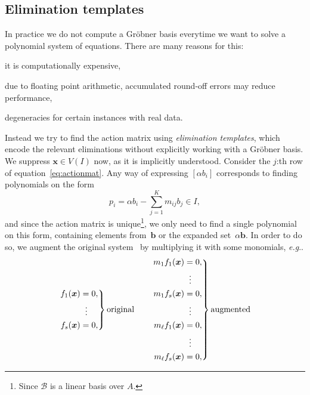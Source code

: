 \documentclass[11pt,a4paper]{article}
\makeatletter
\theoremstyle{definition}
\newcommand{\mat}[1]{\bm{#1}}
\DeclareRobustCommand\eg{\emph{e.g}\@ifnextchar.{}{.\@}}
\makeatother
\begin{document}
\subsection{Elimination templates}
In practice we do not compute a Gröbner basis everytime we want to solve a polynomial system
of equations. There are many reasons for this:
\begin{enumerate*}[label={(\roman*)}]
\item it is computationally expensive,
\item due to floating point arithmetic, accumulated round-off errors may reduce performance,
\item degeneracies for certain instances with real data.
\end{enumerate*}
Instead we try to find the action matrix using \emph{elimination templates}, which encode the
relevant eliminations without explicitly working with a Gröbner basis.
We suppress $\mat{x}\in V(I)$ now, as it is implicitly understood.
Consider the $j$:th row of equation~\eqref{eq:actionmat}. Any way of expressing $[\alpha b_i]$
corresponds to finding polynomials on the form
\begin{equation}\label{eq:polys}
    p_i = \alpha b_i -\sum_{j=1}^Km_{ij}b_{j}\in I,
\end{equation}
and since the action matrix is unique\footnote{Since $\mathcal{B}$ is a linear basis over $A$.},
we only need to find a single polynomial on this form, containing elements from~$\mat{b}$ or the
expanded set~$\alpha\mat{b}$.
In order to do so, we augment the original system~\label{kappa:eq:polsys} by multiplying it
with some monomials, \eg{}
\begin{equation}\label{kappa:eq:polsys}
    \begin{aligned}
    \left.
    \begin{aligned}
    f_1(\mat{x}) & = 0, \\
                 & \hspace{0.575em} \vdots \\
    f_s(\mat{x}) & = 0, \\
    \end{aligned}
    \right\}\text{original}
    \qquad
    \left.
    \begin{aligned}
    m_1f_1(\mat{x}) & = 0, \\
                 & \hspace{0.575em} \vdots \\
    m_1f_s(\mat{x}) & = 0, \\
                 & \hspace{0.575em} \vdots \\
    m_\ell f_1(\mat{x}) & = 0, \\
                 & \hspace{0.575em} \vdots \\
    m_\ell f_s(\mat{x}) & = 0,
    \end{aligned}
    \right\}\text{augmented}
    \end{aligned}
\end{equation}
\end{document}

